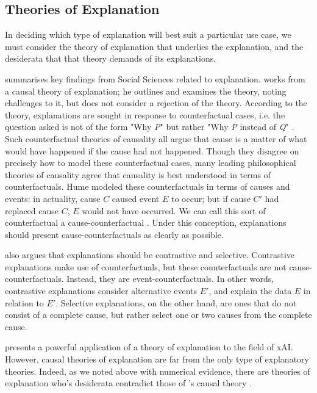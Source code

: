 \subsection{Theories of Explanation}
In deciding which type of explanation will best suit a particular use case, we must consider the theory of explanation that underlies the explanation, and the desiderata that that theory demands of its explanations.

\textcite{miller_explanation_2017} summarises key findings from Social Sciences related to explanation. \textcite{miller_explanation_2017} works from a causal theory of explanation; he outlines and examines the theory, noting challenges to it, but does not consider a rejection of the theory. According to the theory, explanations are sought in response to counterfactual cases, i.e. the question asked is not of the form "Why \textit{P}" but rather "Why \textit{P} instead of \textit{Q}" \cite{miller_explanation_2017}. Such counterfactual theories of causality all argue that cause is a matter of what would have happened if the cause had not happened. Though they disagree on precisely how to model these counterfactual cases, many leading philosophical theories of causality agree that causality is best understood in terms of counterfactuals. Hume modeled these counterfactuals in terms of causes and events: in actuality, cause $C$ caused event $E$ to occur; but if cause $C'$ had replaced cause $C$, $E$ would not have occurred. We can call this sort of counterfactual a cause-counterfactual \cite{miller_explanation_2017}. Under this conception, explanations should present cause-counterfactuals as clearly as possible.

\textcite{miller_explanation_2017} also argues that explanations should be contrastive and selective. Contrastive explanations make use of counterfactuals, but these counterfactuals are not cause-counterfactuals. Instead, they are event-counterfactuals. In other words, contrastive explanations consider alternative events $E'$, and explain the data $E$ in relation to $E'$. Selective explanations, on the other hand, are ones that do not consist of a complete cause, but rather select one or two causes from the complete cause. 

\textcite{miller_explanation_2017} presents a powerful application of a theory of explanation to the field of xAI. However, causal theories of explanation are far from the only type of explanatory theories. Indeed, as we noted above with numerical evidence, there are theories of explanation who's desiderata contradict those of \textcite{miller_explanation_2017}'s causal theory \cite{woodward_scientific_2021}. 

